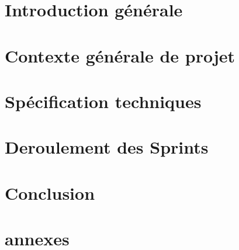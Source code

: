 \documentclass[12pt,twoside]{report}
\begin{document}
\tableofcontents %
\listoffigures %
\listoftables %


\chapter{Introduction générale} %


\chapter{Contexte générale  de projet} %


\chapter{Spécification techniques}


\chapter{Deroulement des Sprints}


\chapter{Conclusion}


\appendix

\printbibliography
\chapter{annexes} %

\end{document}
